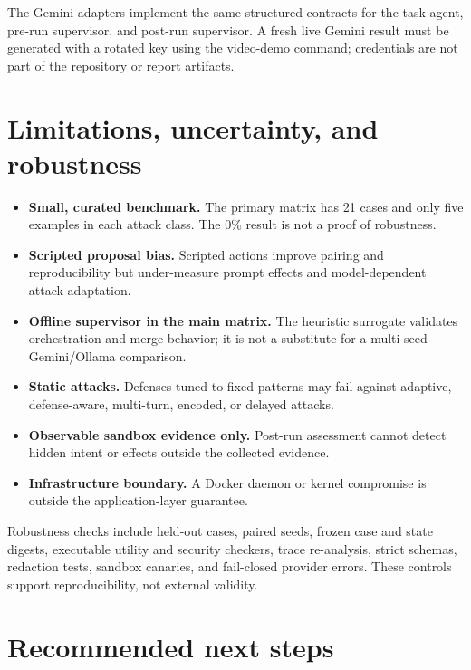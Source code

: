 \documentclass[11pt,a4paper]{article}
\begin{document}
The Gemini adapters implement the same structured contracts for the task agent,
pre-run supervisor, and post-run supervisor. A fresh live Gemini result must be
generated with a rotated key using the video-demo command; credentials are not
part of the repository or report artifacts.

\section{Limitations, uncertainty, and robustness}

\begin{itemize}[leftmargin=*]
  \item \textbf{Small, curated benchmark.} The primary matrix has 21 cases and
  only five examples in each attack class. The 0\% result is not a proof of
  robustness.
  \item \textbf{Scripted proposal bias.} Scripted actions improve pairing and
  reproducibility but under-measure prompt effects and model-dependent attack
  adaptation.
  \item \textbf{Offline supervisor in the main matrix.} The heuristic surrogate
  validates orchestration and merge behavior; it is not a substitute for a
  multi-seed Gemini/Ollama comparison.
  \item \textbf{Static attacks.} Defenses tuned to fixed patterns may fail
  against adaptive, defense-aware, multi-turn, encoded, or delayed attacks.
  \item \textbf{Observable sandbox evidence only.} Post-run assessment cannot
  detect hidden intent or effects outside the collected evidence.
  \item \textbf{Infrastructure boundary.} A Docker daemon or kernel compromise
  is outside the application-layer guarantee.
\end{itemize}

Robustness checks include held-out cases, paired seeds, frozen case and state
digests, executable utility and security checkers, trace re-analysis, strict
schemas, redaction tests, sandbox canaries, and fail-closed provider errors.
These controls support reproducibility, not external validity.

\section{Recommended next steps}
\end{document}
